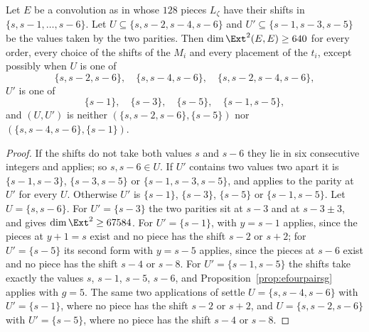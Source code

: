 \begin{corollary}\label{cor:efourseven}
Let $E$ be a convolution as in \cite[Lemma~18.36]{BMB26} whose $128$ pieces $L_{\zeta}$ have their shifts in $\{s,s-1,\dots,s-6\}$. Let $U\subseteq\{s,s-2,s-4,s-6\}$ and $U'\subseteq\{s-1,s-3,s-5\}$ be the values taken by the two parities. Then $\dim\Ext^{2}(E,E)\ge640$ for every order, every choice of the shifts of the $M_{i}$ and every placement of the $t_{i}$, except possibly when $U$ is one of
\[
\{s,s-2,s-6\},\quad\{s,s-4,s-6\},\quad\{s,s-2,s-4,s-6\},
\]
$U'$ is one of
\[
\{s-1\},\quad\{s-3\},\quad\{s-5\},\quad\{s-1,s-5\},
\]
and $(U,U')$ is neither $(\{s,s-2,s-6\},\{s-5\})$ nor $(\{s,s-4,s-6\},\{s-1\})$.
\end{corollary}

\begin{proof}
If the shifts do not take both values $s$ and $s-6$ they lie in six consecutive integers and \cite[Cor.~18.48]{BMB26} applies; so $s,s-6\in U$. If $U'$ contains two values two apart it is $\{s-1,s-3\}$, $\{s-3,s-5\}$ or $\{s-1,s-3,s-5\}$, and \cite[Thm.~18.41]{BMB26} applies to the parity at $U'$ for every $U$. Otherwise $U'$ is $\{s-1\}$, $\{s-3\}$, $\{s-5\}$ or $\{s-1,s-5\}$. Let $U=\{s,s-6\}$. For $U'=\{s-3\}$ the two parities sit at $s-3$ and at $s-3\pm3$, and \cite[Thm.~18.42]{BMB26} gives $\dim\Ext^{2}\ge67584$. For $U'=\{s-1\}$, \cite[Prop.~18.43]{BMB26} with $y=s-1$ applies, since the pieces at $y+1=s$ exist and no piece has the shift $s-2$ or $s+2$; for $U'=\{s-5\}$ its second form with $y=s-5$ applies, since the pieces at $s-6$ exist and no piece has the shift $s-4$ or $s-8$. For $U'=\{s-1,s-5\}$ the shifts take exactly the values $s$, $s-1$, $s-5$, $s-6$, and Proposition~\ref{prop:efourpairsg} applies with $g=5$. The same two applications of \cite[Prop.~18.43]{BMB26} settle $U=\{s,s-4,s-6\}$ with $U'=\{s-1\}$, where no piece has the shift $s-2$ or $s+2$, and $U=\{s,s-2,s-6\}$ with $U'=\{s-5\}$, where no piece has the shift $s-4$ or $s-8$.
\end{proof}

